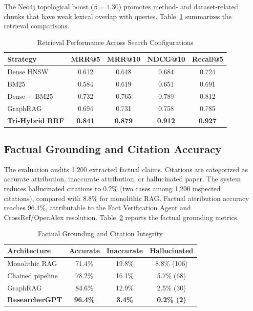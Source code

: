 \documentclass[conference]{IEEEtran}
\begin{document}
 The Neo4j topological boost ($\beta = 1.30$) promotes method- and dataset-related chunks that have weak lexical overlap with queries. Table~\ref{tab:retrieval} summarizes the retrieval comparisons.

\begin{table}[!t]
\caption{Retrieval Performance Across Search Configurations}
\label{tab:retrieval}
\centering
\footnotesize
\setlength{\tabcolsep}{3.5pt}
\begin{tabular}{@{}lcccc@{}}
\toprule
\textbf{Strategy} & \textbf{MRR@5} & \textbf{MRR@10} & \textbf{NDCG@10} & \textbf{Recall@5} \\
\midrule
Dense HNSW & 0.612 & 0.648 & 0.684 & 0.724 \\
BM25 & 0.584 & 0.619 & 0.651 & 0.691 \\
Dense + BM25 & 0.732 & 0.765 & 0.789 & 0.812 \\
GraphRAG & 0.694 & 0.731 & 0.758 & 0.785 \\
\textbf{Tri-Hybrid RRF} & \textbf{0.841} & \textbf{0.879} & \textbf{0.912} & \textbf{0.927} \\
\bottomrule
\end{tabular}
\end{table}

\subsection{Factual Grounding and Citation Accuracy}
The evaluation audits 1,200 extracted factual claims. Citations are categorized as accurate attribution, inaccurate attribution, or hallucinated paper. The system reduces hallucinated citations to 0.2\% (two cases among 1,200 inspected citations), compared with 8.8\% for monolithic RAG. Factual attribution accuracy reaches 96.4\%, attributable to the Fact Verification Agent and CrossRef/OpenAlex resolution. Table~\ref{tab:citation} reports the factual grounding metrics.

\begin{table}[!t]
\caption{Factual Grounding and Citation Integrity}
\label{tab:citation}
\centering
\footnotesize
\begin{tabular}{@{}lccc@{}}
\toprule
\textbf{Architecture} & \textbf{Accurate} & \textbf{Inaccurate} & \textbf{Hallucinated} \\
\midrule
Monolithic RAG & 71.4\% & 19.8\% & 8.8\% (106) \\
Chained pipeline & 78.2\% & 16.1\% & 5.7\% (68) \\
GraphRAG & 84.6\% & 12.9\% & 2.5\% (30) \\
\textbf{ResearcherGPT} & \textbf{96.4\%} & \textbf{3.4\%} & \textbf{0.2\% (2)} \\
\bottomrule
\end{tabular}
\end{table}
\end{document}
